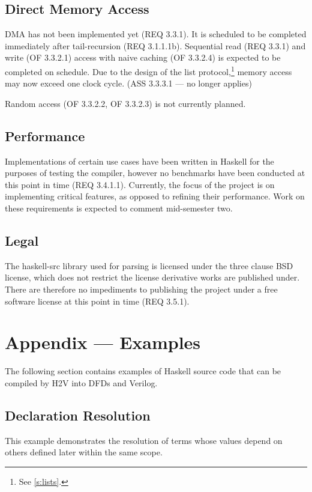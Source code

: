 \documentclass[english,onecolumn]{article}
\begin{document}
\subsection{Direct Memory Access}
DMA has not been implemented yet (REQ 3.3.1). It is scheduled to be completed immediately after tail-recursion (REQ 3.1.1.1b). 
Sequential read (REQ 3.3.1) and write (OF 3.3.2.1) access with naive caching (OF 3.3.2.4) is expected to be completed on schedule. 
Due to the design of the list protocol,\footnote{See \ref{s:lists}.} memory access may now exceed one clock cycle. (ASS 3.3.3.1 --- no longer applies)

Random access (OF 3.3.2.2, OF 3.3.2.3) is not currently planned.

\subsection{Performance}
Implementations of certain use cases have been written in Haskell for the purposes of testing the compiler, however no benchmarks have been conducted at this point in time (REQ 3.4.1.1). Currently, the focus of the project is on implementing critical features, as opposed to refining their performance. Work on these requirements is expected to comment mid-semester two.

\subsection{Legal}
The haskell-src library used for parsing is licensed under the three clause BSD license, which does not restrict the license derivative works are published under. There are therefore no impediments to publishing the project under a free software license at this point in time (REQ 3.5.1).

\appendix
\lstset{basicstyle=\footnotesize}

\section{Appendix --- Examples}
The following section contains examples of Haskell source code that can be compiled by H2V into DFDs and Verilog.

\subsection{Declaration Resolution}
This example demonstrates the resolution of terms whose values depend on others defined later within the same scope.
\end{document}
